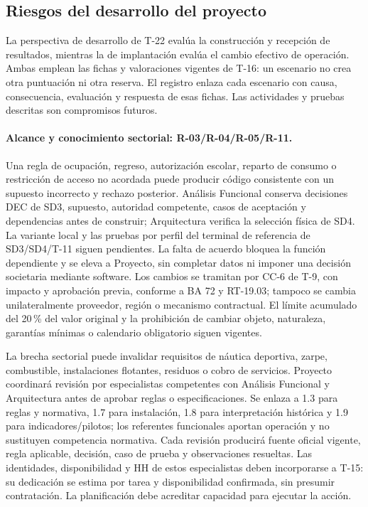 \subsection{Riesgos del desarrollo del proyecto}\label{sec:sd8-desarrollo}
La perspectiva de desarrollo de T-22 evalúa la construcción y recepción de resultados, mientras la de implantación evalúa el cambio efectivo de operación. Ambas emplean las fichas y valoraciones vigentes de T-16: un escenario no crea otra puntuación ni otra reserva. El registro  enlaza cada escenario con causa, consecuencia, evaluación y respuesta de esas fichas. Las actividades y pruebas descritas son compromisos futuros. \parencites[Formulario T-22; arts.~17--18; pp.~12--14, 68]{sd8-ba}[8.2--8.3]{sd8-ex}

\paragraph{Alcance y conocimiento sectorial: R-03/R-04/R-05/R-11.}
Una regla de ocupación, regreso, autorización escolar, reparto de consumo o restricción de acceso no acordada puede producir código consistente con un supuesto incorrecto y rechazo posterior. Análisis Funcional conserva decisiones DEC de SD3, supuesto, autoridad competente, casos de aceptación y dependencias antes de construir; Arquitectura verifica la selección física de SD4. La variante local y las pruebas por perfil del terminal de referencia de SD3/SD4/T-11 siguen pendientes. La falta de acuerdo bloquea la función dependiente y se eleva a Proyecto, sin completar datos ni imponer una decisión societaria mediante software. Los cambios se tramitan por CC-6 de T-9, con impacto y aprobación previa, conforme a BA 72 y RT-19.03; tampoco se cambia unilateralmente proveedor, región o mecanismo contractual. El límite acumulado del 20\,\% del valor original y la prohibición de cambiar objeto, naturaleza, garantías mínimas o calendario obligatorio siguen vigentes.

La brecha sectorial puede invalidar requisitos de náutica deportiva, zarpe, combustible, instalaciones flotantes, residuos o cobro de servicios. Proyecto coordinará revisión por especialistas competentes con Análisis Funcional y Arquitectura antes de aprobar reglas o especificaciones. Se enlaza a 1.3 para reglas y normativa, 1.7 para instalación, 1.8 para interpretación histórica y 1.9 para indicadores/pilotos; los referentes funcionales aportan operación y no sustituyen competencia normativa. Cada revisión producirá fuente oficial vigente, regla aplicable, decisión, caso de prueba y observaciones resueltas. Las identidades, disponibilidad y HH de estos especialistas deben incorporarse a T-15: su dedicación se estima por tarea y disponibilidad confirmada, sin presumir contratación. La planificación debe acreditar capacidad para ejecutar la acción. \parencite[numeral 16.2; RT-15.02; caps.~11--12]{sd8-c07}


